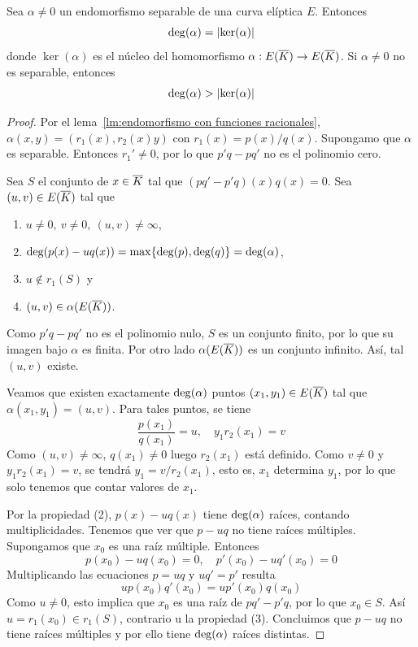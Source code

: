 \begin{proposicion}\label{pp:cardinal del núcleo}
	Sea $\alpha \neq 0$ un endomorfismo separable de una curva elíptica $E$. Entonces
	$$
		\deg(\alpha) = \left\vert{\ker(\alpha)}\right\vert
	$$
	donde $\ker(\alpha)$ es el núcleo del homomorfismo $\alpha : E(\overline{K}) \to E(\overline{K})$. Si $\alpha \neq 0$ no es separable, entonces
	$$
		\deg(\alpha) > \left\vert{\ker(\alpha)}\right\vert
	$$
\end{proposicion}
\begin{proof}
	Por el lema~\ref{lm:endomorfismo con funciones racionales}, $\alpha(x, y) = (r_1(x), r_2(x) y)$ con $r_1(x) = p(x) / q(x)$. Supongamo que $\alpha$ es separable. Entonces $r_1' \neq 0$, por lo que $p' q - p q'$ no es el polinomio cero.

	Sea $S$ el conjunto de $x \in \overline{K}$ tal que $(p q' - p' q)(x) q(x) = 0$. Sea $(u, v) \in E(\overline{K})$ tal que
	\begin{enumerate}
		\item $u \neq 0,\ v \neq 0,\ (u, v) \neq \infty$,
		\item $\deg (p(x) - u q(x) ) = \max \{ \deg(p), \deg(q) \} = \deg(\alpha)$,
		\item $u \not\in r_1(S)$ y
		\item $(u, v) \in \alpha(E(\overline{K}))$.
	\end{enumerate}
	Como $p' q - p q'$ no es el polinomio nulo, $S$ es un conjunto finito, por lo que su imagen bajo $\alpha$ es finita. Por otro lado $\alpha(E(\overline{K}))$ es un conjunto infinito. Así, tal $(u, v)$ existe.

	Veamos que existen exactamente $\deg(\alpha)$ puntos $(x_1, y_1) \in E(\overline{K})$ tal que $\alpha(x_1, y_1) = (u, v)$. Para tales puntos, se tiene
	$$
	\frac{p(x_1)}{q(x_1)} = u, \quad y_1 r_2(x_1) = v
	$$
	Como $(u, v) \neq \infty$, $q(x_1) \neq 0$ luego $r_2(x_1)$ está definido. Como $v \neq 0$ y $y_1 r_2(x_1) = v$, se tendrá $y_1 = v/r_2(x_1)$, esto es, $x_1$ determina $y_1$, por lo que solo tenemos que contar valores de $x_1$.

	Por la propiedad (2), $p(x) - u q(x)$ tiene $\deg(\alpha)$ raíces, contando multiplicidades. Tenemos que ver que $p - u q$ no tiene raíces múltiples. Supongamos que $x_0$ es una raíz múltiple. Entonces
	$$
		p(x_0) - u q(x_0) = 0, \quad p'(x_0) - u q'(x_0) = 0
	$$
	Multiplicando las ecuaciones $p = u q$ y $u q' = p'$ resulta
	$$
		u p(x_0) q'(x_0) = u p'(x_0) q(x_0)
	$$
	Como $u \neq 0$, esto implica que $x_0$ es una raíz de $p q' - p' q$, por lo que $x_0 \in S$. Así $u = r_1(x_0) \in r_1(S)$, contrario u la propiedad (3). Concluimos que $p - u q$ no tiene raíces múltiples y por ello tiene $\deg(\alpha)$ raíces distintas.


\end{proof}
